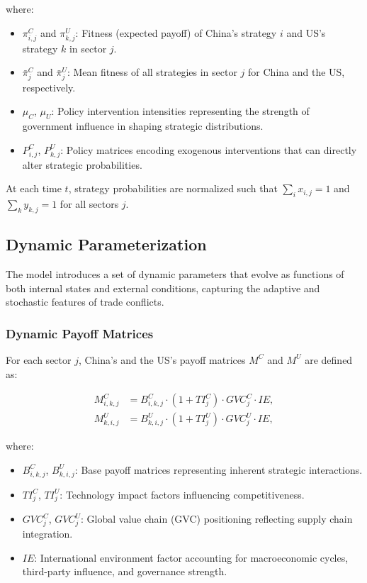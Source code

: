 \documentclass{article}
\begin{document}
where:
\begin{itemize}
    \item \(\pi_{i,j}^C\) and \(\pi_{k,j}^U\): Fitness (expected payoff) of China’s strategy \(i\) and US’s strategy \(k\) in sector \(j\).
    \item \(\bar{\pi}_j^C\) and \(\bar{\pi}_j^U\): Mean fitness of all strategies in sector \(j\) for China and the US, respectively.
    \item \(\mu_C\), \(\mu_U\): Policy intervention intensities representing the strength of government influence in shaping strategic distributions.
    \item \(P_{i,j}^C\), \(P_{k,j}^U\): Policy matrices encoding exogenous interventions that can directly alter strategic probabilities.
\end{itemize}

At each time \(t\), strategy probabilities are normalized such that \(\sum_i x_{i,j} = 1\) and \(\sum_k y_{k,j} = 1\) for all sectors \(j\).

\subsection{Dynamic Parameterization}

The model introduces a set of dynamic parameters that evolve as functions of both internal states and external conditions, capturing the adaptive and stochastic features of trade conflicts.

\subsubsection{Dynamic Payoff Matrices}

For each sector \(j\), China’s and the US’s payoff matrices \(M^C\) and \(M^U\) are defined as:

\begin{align*}
M_{i,k,j}^C &= B_{i,k,j}^C \cdot (1 + TI_j^C) \cdot GVC_j^C \cdot IE, \\
M_{k,i,j}^U &= B_{k,i,j}^U \cdot (1 + TI_j^U) \cdot GVC_j^U \cdot IE,
\end{align*}

where:
\begin{itemize}
    \item \(B_{i,k,j}^C\), \(B_{k,i,j}^U\): Base payoff matrices representing inherent strategic interactions.
    \item \(TI_j^C\), \(TI_j^U\): Technology impact factors influencing competitiveness.
    \item \(GVC_j^C\), \(GVC_j^U\): Global value chain (GVC) positioning reflecting supply chain integration.
    \item \(IE\): International environment factor accounting for macroeconomic cycles, third-party influence, and governance strength.
\end{itemize}
\end{document}
